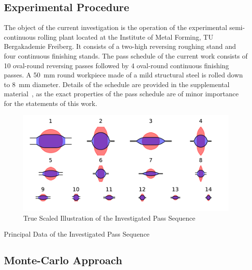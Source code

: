 \subsection{Experimental Procedure}\label{subsec:experimental-procedure}


The object of the current investigation is the operation of the experimental semi-continuous rolling plant located at the Institute of Metal Forming, TU Bergakademie Freiberg.
It consists of a two-high reversing roughing stand and four continuous finishing stands.
The pass schedule of the current work consists of 10 oval-round reversing passes followed by 4 oval-round continuous finishing passes.
A \qty{50}{\milli\meter} round workpiece made of a mild structural steel is rolled down to \qty{8}{\milli\meter} diameter.
Details of the schedule are provided in the supplemental material~\cite{esaform2023_weiner_supp}, as the exact properties of the pass schedule are of minor importance for the statements of this work.

\begin{figure}
    \centering
    \includegraphics{img/plot_pass_sequence}
    \caption{True Scaled Illustration of the Investigated Pass Sequence}
    \label{fig:plot_pass_sequence}
\end{figure}


\begin{table}
    \centering
    \caption{Principal Data of the Investigated Pass Sequence}
    \label{tab:process_conditions}
    
\end{table}


\subsection{Monte-Carlo Approach}\label{subsec:monte-carlo-approach}

